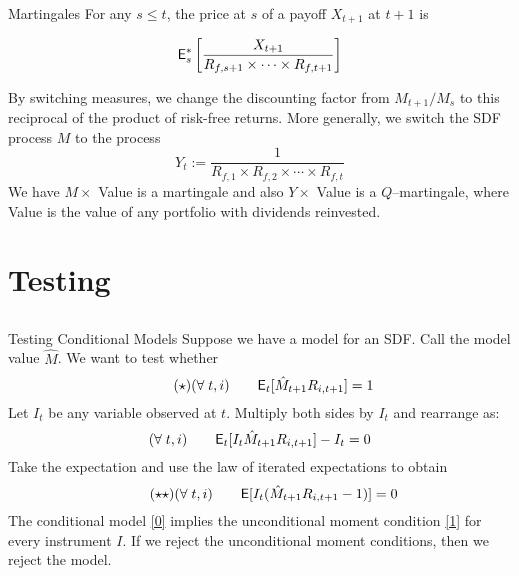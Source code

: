 \documentclass[xcolor=dvipsnames,10pt]{beamer}
\begin{document}
\begin{frame}{Martingales}
    For any $s\le t$, the price at $s$ of a payoff $X_{t+1}$ at $t+1$ is
    
    $$\mathsf{E}^*_s\left[\frac{X_{t+1}}{R_{f,s+1}\times \cdots \times R_{f,t+1}}\right]$$
    
    By switching measures, we change the discounting factor from $M_{t+1}/M_s$ to this reciprocal of the product of risk-free returns.  More generally, we switch the SDF process $M$ to the process
    $$Y_t := \frac{1}{R_{f,1} \times R_{f,2} \times \cdots \times R_{f,t}}$$
    We have $M \times$ Value is a martingale and also $Y \times$ Value is a $Q$--martingale, where Value is the value of any portfolio with dividends reinvested.
\end{frame}

\section{Testing}\subsection{}
\begin{frame}{Testing Conditional Models}
Suppose we have a model for an SDF.  Call the model value $\hat M$.  We want to test whether
\begin{equation}\label{0}\tag{$\star$}
(\forall\;t, i) \qquad \mathsf{E}_t[\hat M_{t+1}R_{i,t+1}] = 1
\end{equation}
Let $I_t$ be any variable observed at $t$.  Multiply both sides by $I_t$ and rearrange as:
$$(\forall\;t, i) \qquad \mathsf{E}_t[I_t\hat M_{t+1}R_{i,t+1}] -I_t =0$$
Take the expectation and use the law of iterated expectations to obtain
\begin{equation}\label{1}\tag{$\star\star$}
(\forall\;t, i) \qquad \mathsf{E}[I_t(\hat M_{t+1}R_{i,t+1} -1)] =0
\end{equation}
The conditional model \eqref{0} implies the unconditional moment condition \eqref{1} for every \alert{instrument} $I$.  If we reject the unconditional moment conditions, then we reject the model. 
\end{frame}
\end{document}
